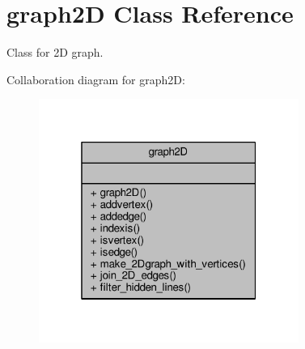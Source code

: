 \hypertarget{classgraph2D}{}\section{graph2D Class Reference}
\label{classgraph2D}


Class for 2D graph.  




Collaboration diagram for graph2D\+:\nopagebreak
\begin{figure}[H]
\begin{center}
\leavevmode
\includegraphics[width=241pt]{classgraph2D__coll__graph}
\end{center}
\end{figure}
